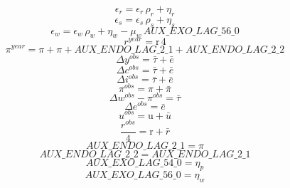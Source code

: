 \begin{dmath}
{{\epsilon_{r}}}={{\epsilon_{r}}}\, {{\rho_{r}}}+{{\eta_{r}}}
\end{dmath}
\begin{dmath}
{{\epsilon_{s}}}={{\epsilon_{s}}}\, {{\rho_{s}}}+{{\eta_{s}}}
\end{dmath}
\begin{dmath}
{{\epsilon_{w}}}={{\epsilon_{w}}}\, {{\rho_{w}}}+{{\eta_{w}}}-{{\mu_{w}}}\, {AUX\_EXO\_LAG\_56\_0}
\end{dmath}
\begin{dmath}
{{r^{year}}}={{\mathrm{r}}}\, 4
\end{dmath}
\begin{dmath}
{{\pi^{year}}}={{\pi}}+{{\pi}}+{AUX\_ENDO\_LAG\_2\_1}+{AUX\_ENDO\_LAG\_2\_2}
\end{dmath}
\begin{dmath}
{{\Delta y^{obs}}}={{\bar{\tau}}}+{{\bar{e}}}
\end{dmath}
\begin{dmath}
{{\Delta c^{obs}}}={{\bar{\tau}}}+{{\bar{e}}}
\end{dmath}
\begin{dmath}
{{\Delta i^{obs}}}={{\bar{\tau}}}+{{\bar{e}}}
\end{dmath}
\begin{dmath}
{{\pi^{obs}}}={{\pi}}+{{\bar{\pi}}}
\end{dmath}
\begin{dmath}
{{\Delta w^{obs}}}-{{\pi^{obs}}}={{\bar{\tau}}}
\end{dmath}
\begin{dmath}
{{\Delta e^{obs}}}={{\bar{e}}}
\end{dmath}
\begin{dmath}
{{u^{obs}}}={{\mathrm{u}}}+{{\bar{u}}}
\end{dmath}
\begin{dmath}
\frac{{{r^{obs}}}}{4}={{\mathrm{r}}}+{{\bar{r}}}
\end{dmath}
\begin{dmath}
{AUX\_ENDO\_LAG\_2\_1}={{\pi}}
\end{dmath}
\begin{dmath}
{AUX\_ENDO\_LAG\_2\_2}={AUX\_ENDO\_LAG\_2\_1}
\end{dmath}
\begin{dmath}
{AUX\_EXO\_LAG\_54\_0}={{\eta_{p}}}
\end{dmath}
\begin{dmath}
{AUX\_EXO\_LAG\_56\_0}={{\eta_{w}}}
\end{dmath}
